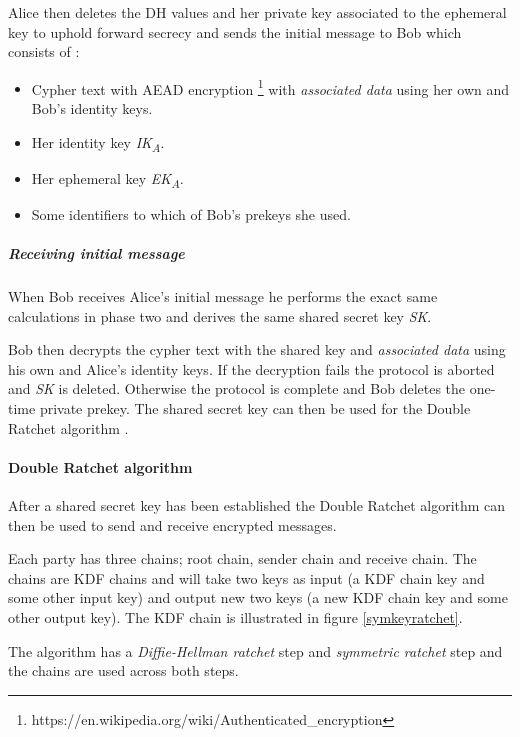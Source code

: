Alice then deletes the DH values and her private key associated to the ephemeral key to uphold forward secrecy and sends the initial message to Bob which consists of \cite{tripledh}: 

\begin{itemize}
	\item Cypher text with AEAD encryption  \footnote{https://en.wikipedia.org/wiki/Authenticated\_encryption} with \emph{associated data} using her own and Bob's identity keys.
	\item Her identity key \emph{IK\textsubscript{A}}.
	\item Her ephemeral key \emph{EK\textsubscript{A}}.
	\item Some identifiers to which of Bob's prekeys she used.
	
\end{itemize} 


\subparagraph{Receiving initial message}

When Bob receives Alice's initial message he performs the exact same calculations in phase two and derives the same shared secret key \emph{SK}.

Bob then decrypts the cypher text with the shared key and \emph{associated data} using his own and Alice's identity keys. If the decryption fails the protocol is aborted and \emph{SK} is deleted. Otherwise the protocol is complete and Bob deletes the one-time private prekey. 
The shared secret key can then be used for the Double Ratchet algorithm \cite{tripledh}.  

\paragraph{Double Ratchet algorithm}

After a shared secret key has been established the Double Ratchet algorithm can then be used to send and receive encrypted messages.

Each party has three chains; root chain, sender chain and receive chain. The chains are KDF chains and will take two keys as input (a KDF chain key and some other input key) and output new two keys (a new KDF chain key and some other output key). The KDF chain is illustrated in figure \ref{symkeyratchet}.

The algorithm has a \emph{Diffie-Hellman ratchet} step and \emph{symmetric ratchet} step and the chains are used across both steps.

